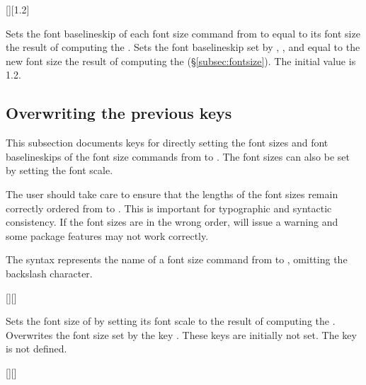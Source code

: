 \documentclass{beery}
\begin{document}
\begin{mydisplaycode}
  [][1.2]
\end{mydisplaycode}

Sets the font baselineskip of each font size command from  to  equal to its font size \texttimes{} the result of computing the .
Sets the font baselineskip set by , , and  equal to the new font size \texttimes{} the result of computing the  (\S\ref{subsec:fontsize}).
The initial value is \num{1.2}.


\subsection{Overwriting the previous keys}
\label{subsec:overwriting}

This subsection documents keys for directly setting the font sizes and font baselineskips of the font size commands from  to .
The font sizes can also be set by setting the font scale.

The user should take care to ensure that the lengths of the font sizes remain correctly ordered from  to .
This is important for typographic and syntactic consistency.
If the font sizes are in the wrong order,  will issue a warning and some package features may not work correctly.

The syntax  represents the name of a font size command from  to , omitting the backslash character.
\pagebreak%

\begin{mydisplaycode}
  [][]
\end{mydisplaycode}

Sets the font size of  by setting its font scale to the result of computing the .
Overwrites the font size set by the key .
These keys are initially not set.
The key  is not defined.

\begin{mydisplaycode}
  [][]
\end{mydisplaycode}
\end{document}
